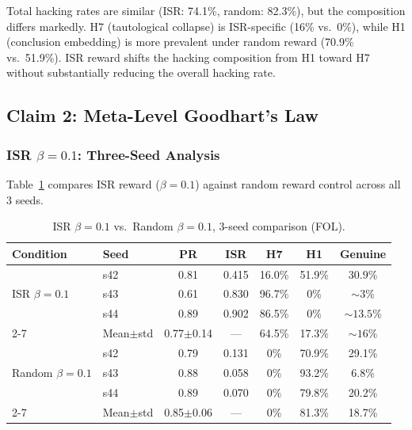 \documentclass[11pt,a4paper]{article}
\newcommand{\isr}{\textsc{ISR}}
\begin{document}
Total hacking rates are similar (ISR: 74.1\%, random: 82.3\%), but the composition differs markedly.
H7 (tautological collapse) is \isr{}-specific (16\% vs.\ 0\%), while H1 (conclusion embedding) is more prevalent under random reward (70.9\% vs.\ 51.9\%).
\isr{} reward shifts the hacking composition from H1 toward H7 without substantially reducing the overall hacking rate.


\subsection{Claim 2: Meta-Level Goodhart's Law}
\label{sec:claim2}

\subsubsection{ISR $\beta{=}0.1$: Three-Seed Analysis}
\label{sec:beta01}

Table~\ref{tab:isr_vs_random} compares \isr{} reward ($\beta{=}0.1$) against random reward control across all 3 seeds.

\begin{table}[h]
\centering
\caption{ISR $\beta{=}0.1$ vs.\ Random $\beta{=}0.1$, 3-seed comparison (FOL).}
\label{tab:isr_vs_random}
\begin{tabular}{llccccc}
\toprule
Condition & Seed & PR & ISR & H7 & H1 & Genuine \\
\midrule
\multirow{3}{*}{ISR $\beta{=}0.1$}
& s42 & 0.81 & 0.415 & 16.0\% & 51.9\% & 30.9\% \\
& s43 & 0.61 & 0.830 & 96.7\% & 0\% & ${\sim}3\%$ \\
& s44 & 0.89 & 0.902 & 86.5\% & 0\% & ${\sim}13.5\%$ \\
\cmidrule{2-7}
& Mean$\pm$std & 0.77$\pm$0.14 & --- & 64.5\% & 17.3\% & ${\sim}16\%$ \\
\midrule
\multirow{3}{*}{Random $\beta{=}0.1$}
& s42 & 0.79 & 0.131 & 0\% & 70.9\% & 29.1\% \\
& s43 & 0.88 & 0.058 & 0\% & 93.2\% & 6.8\% \\
& s44 & 0.89 & 0.070 & 0\% & 79.8\% & 20.2\% \\
\cmidrule{2-7}
& Mean$\pm$std & 0.85$\pm$0.06 & --- & 0\% & 81.3\% & 18.7\% \\
\bottomrule
\end{tabular}
\end{table}
\end{document}
